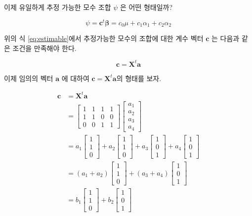\documentclass[
  10pt,
]{book}
\theoremstyle{definition}
\theoremstyle{definition}
\theoremstyle{definition}
\theoremstyle{definition}
\theoremstyle{remark}
\begin{document}
이제 유일하게 추정 가능한 모수 조합 \(\psi\) 은 어떤 형태일까?

\[ \psi = \bm c^t \bm \beta = c_0 \mu + c_1 \alpha_1 + c_2 \alpha_2 \]

위의 식 \eqref{eq:estimable}에서 추정가능한 모수의 조합에 대한 계수 벡터 \(\bm c\)
는 다음과 같은 조건을 만족해야 한다.

\[ \bm c = {\bm X}^t \bm a \]

이제 임의의 벡터 \(\bm a\) 에 대하여 \(\bm c= \bm X^t \bm a\)의 형태를 보자.

\begin{align}
\bm c &= 
\bm X^t \bm a \\ & = 
\begin{bmatrix}
1 & 1 & 1 & 1  \\
1 & 1 & 0 & 0  \\
0 & 0 & 1 & 1  
\end{bmatrix}
\begin{bmatrix}
a_1 \\
a_2 \\
a_3 \\
a_4 
\end{bmatrix} \\
& = 
a_1 
\begin{bmatrix}
1 \\
1 \\
0 
\end{bmatrix}
+
a_2
\begin{bmatrix}
1 \\
1 \\
0 
\end{bmatrix}
+ 
a_3 
\begin{bmatrix}
1 \\
0 \\
1 
\end{bmatrix}
+
 a_4
\begin{bmatrix}
1 \\
0 \\
1 
\end{bmatrix} \\
& = 
(a_1 + a_2)
\begin{bmatrix}
1 \\
1 \\
0 
\end{bmatrix}
+ 
(a_3 + a_4)
\begin{bmatrix}
1 \\
0 \\
1 
\end{bmatrix} \\
&= 
b_1
\begin{bmatrix}
1 \\
1 \\
0 
\end{bmatrix}
+ 
b_2
\begin{bmatrix}
1 \\
0 \\
1 
\end{bmatrix} 
\label{eq:esticond}
\end{align}
\end{document}
